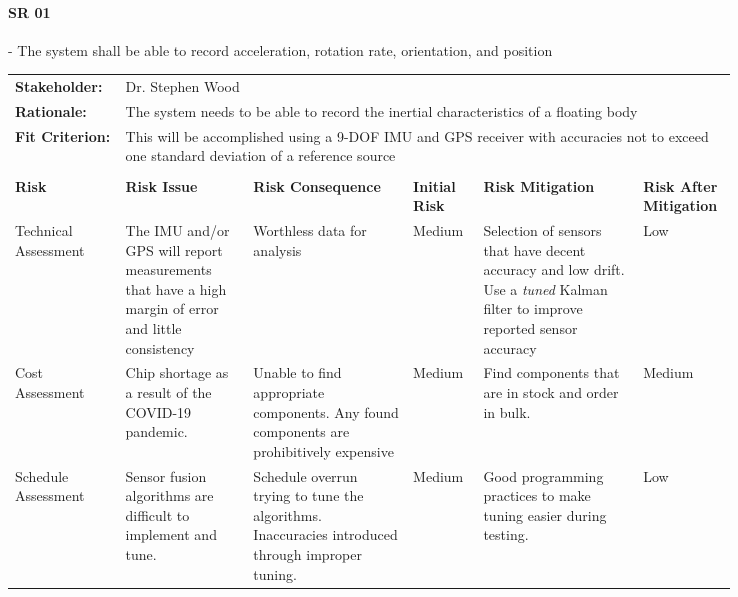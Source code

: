 \begin{landscape}
\paragraph*{SR 01} - The system shall be able to record acceleration, rotation rate, orientation, and position

{\fontsize{8pt}{8pt}\selectfont
\begin{longtable}{| p{0.12\linewidth} | p{0.16\linewidth} |  p{0.20\linewidth} | p{0.08\linewidth} | p{0.20\linewidth} | p{0.08\linewidth} |}
	\hline \endlastfoot
	
	\hline
	\rowcolor[gray]{0.8}
	\multicolumn{6}{|c|}{ } \\
	\hline
	\textbf{Stakeholder:} & \multicolumn{5}{|l|}{Dr. Stephen Wood} \\
	\hline
	\textbf{Rationale:} & \multicolumn{5}{|p{0.8\linewidth}|}{The system needs to be able to record the inertial characteristics of a floating body} \\
	\hline
	\textbf{Fit Criterion:} & \multicolumn{5}{|p{0.8\linewidth}|}{This will be accomplished using a 9-DOF IMU and GPS receiver with accuracies not to exceed one standard deviation of a reference source} \\
	\hline
	\rowcolor[gray]{0.8}
	\multicolumn{6}{|c|}{ } \\
	\hline
	\textbf{Risk} & \textbf{Risk Issue} & \textbf{Risk Consequence} & \textbf{Initial Risk} & \textbf{Risk Mitigation} & \textbf{Risk \newline After \newline Mitigation} \\
	\hline
	Technical \newline Assessment & The IMU and/or GPS will report measurements that have a high margin of error and little consistency & Worthless data for analysis & \cellcolor{yellow} Medium & Selection of sensors that have decent accuracy and low drift. \newline Use a \emph{tuned} Kalman filter to improve reported sensor accuracy & \cellcolor{green} Low \\
	\hline
	Cost \newline Assessment & Chip shortage as a result of the COVID-19 pandemic. & Unable to find appropriate components. \newline Any found components are prohibitively expensive & \cellcolor{yellow} Medium & Find components that are in stock and order in bulk. & \cellcolor{yellow} Medium \\
	\hline
	Schedule \newline Assessment & Sensor fusion algorithms are difficult to implement and tune. & Schedule overrun trying to tune the algorithms. \newline Inaccuracies introduced through improper tuning. & \cellcolor{yellow} Medium & Good programming practices to make tuning easier during testing. & \cellcolor{green} Low \\

\end{longtable}}
\end{landscape}

